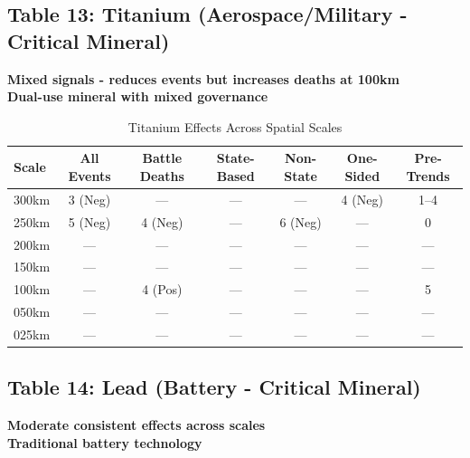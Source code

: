 \documentclass[11pt]{article}
\begin{document}
\clearpage

\subsection{Table 13: Titanium (Aerospace/Military - Critical Mineral)}

\textbf{Mixed signals - reduces events but increases deaths at 100km}\\
\textbf{Dual-use mineral with mixed governance}

\begin{table}[H]
\centering
\caption{Titanium Effects Across Spatial Scales}
\begin{tabular}{lcccccc}
\toprule
Scale & All Events & Battle Deaths & State-Based & Non-State & One-Sided & Pre-Trends \\
\midrule
300km & 3 (Neg)   & ---           & ---         & ---       & 4 (Neg)   & 1--4       \\
250km & 5 (Neg)   & 4 (Neg)       & ---         & 6 (Neg)   & ---       & 0          \\
200km & ---       & ---           & ---         & ---       & ---       & ---        \\
150km & ---       & ---           & ---         & ---       & ---       & ---        \\
100km & ---       & 4 (Pos)       & ---         & ---       & ---       & 5          \\
050km & ---       & ---           & ---         & ---       & ---       & ---        \\
025km & ---       & ---           & ---         & ---       & ---       & ---        \\
\bottomrule
\end{tabular}
\end{table}

\subsection{Table 14: Lead (Battery - Critical Mineral)}

\textbf{Moderate consistent effects across scales}\\
\textbf{Traditional battery technology}
\end{document}
